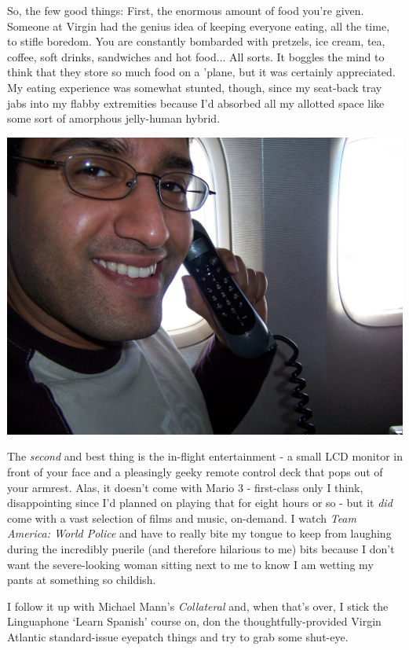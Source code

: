 \documentclass[a5paper,titlepage,11pt,draft]{book}
\begin{document}
So, the few good things:  First, the enormous amount of food you're given.  Someone at Virgin had the genius idea of keeping everyone eating, all the time, to stifle boredom.  You are constantly bombarded with pretzels, ice cream, tea, coffee, soft drinks, sandwiches and hot food...  All sorts.  It boggles the mind to think that they store so much food on a 'plane, but it was certainly appreciated.  My eating experience was somewhat stunted, though, since my seat-back tray jabs into my flabby extremities because I'd absorbed all my allotted space like some sort of amorphous jelly-human hybrid.

\begin{center}\includegraphics[width=\textwidth]{gfx/100_0991}\end{center}

The \emph{second} and best thing is the in-flight entertainment - a small LCD monitor in front of your face and a pleasingly geeky remote control deck that pops out of your armrest.  Alas, it doesn't come with Mario 3 - first-class only I think, disappointing since I'd planned on playing that for eight hours or so - but it \emph{did} come with a vast selection of films and music, on-demand.  I watch \emph{Team America: World Police} and have to really bite my tongue to keep from laughing during the incredibly puerile (and therefore hilarious to me) bits because I don't want the severe-looking woman sitting next to me to know I am wetting my pants at something so childish.


I follow it up with Michael Mann's \emph{Collateral} and, when that's over, I stick the Linguaphone `Learn Spanish' course on, don the thoughtfully-provided Virgin Atlantic standard-issue eyepatch things and try to grab some shut-eye.
\end{document}
